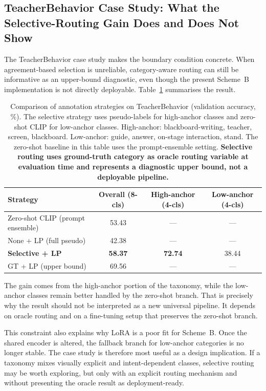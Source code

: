 \documentclass[10pt,letterpaper]{article}
\begin{document}
\subsection*{TeacherBehavior Case Study: What the Selective-Routing
Gain Does and Does Not Show}

The TeacherBehavior case study makes the boundary condition concrete.
When agreement-based selection is unreliable, category-aware routing
can still be informative as an upper-bound diagnostic, even though the
present Scheme~B implementation is not directly deployable.
Table~\ref{tab:selective_results} summarises the result.

\begin{table}[H]
\caption{Comparison of annotation strategies on TeacherBehavior
(validation accuracy, \%). The selective strategy uses pseudo-labels
for high-anchor classes and zero-shot CLIP for low-anchor classes.
High-anchor: blackboard-writing, teacher, screen, blackboard.
Low-anchor: guide, answer, on-stage interaction, stand.
The zero-shot baseline in this table uses the prompt-ensemble setting.
\textbf{Selective routing uses ground-truth category as oracle routing
variable at evaluation time and represents a diagnostic upper bound,
not a deployable pipeline.}}
\label{tab:selective_results}
\centering
\begin{tabular}{lccc}
\toprule
\textbf{Strategy} & \textbf{Overall (8-cls)} &
\textbf{High-anchor (4-cls)} & \textbf{Low-anchor (4-cls)} \\
\midrule
Zero-shot CLIP (prompt ensemble) & 53.43 & --- & --- \\
None + LP (full pseudo) & 42.38 & --- & --- \\
\textbf{Selective + LP} & \textbf{58.37} & \textbf{72.74} & 38.44 \\
GT + LP (upper bound) & 69.56 & --- & --- \\
\bottomrule
\end{tabular}
\end{table}

The gain comes from the high-anchor portion of the taxonomy, while the
low-anchor classes remain better handled by the zero-shot branch.
That is precisely why the result should not be interpreted as a new
universal pipeline.
It depends on oracle routing and on a fine-tuning setup that preserves
the zero-shot branch.

This constraint also explains why LoRA is a poor fit for Scheme~B.
Once the shared encoder is altered, the fallback branch for low-anchor
categories is no longer stable.
The case study is therefore most useful as a design implication.
If a taxonomy mixes visually explicit and intent-dependent classes,
selective routing may be worth exploring, but only with an explicit
routing mechanism and without presenting the oracle result as
deployment-ready.
\end{document}
